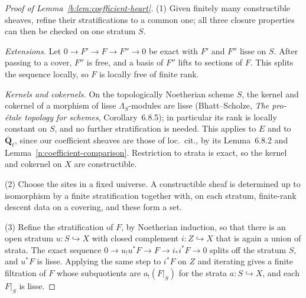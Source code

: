 \documentclass[11pt,a4paper]{article}
\numberwithin{equation}{section}
\theoremstyle{definition}
\theoremstyle{remark}
\newcommand{\Qbar}{\overline{\mathbf Q}_\ell}
\begin{document}
\begin{proof}[Proof of Lemma~\ref{b:lem:coefficient-heart}]
(1) Given finitely many constructible sheaves, refine their
stratifications to a common one; all three closure properties can then
be checked on one stratum $S$.

\emph{Extensions.} Let $0\to F'\to F\to F''\to0$ be exact with $F'$ and
$F''$ lisse on $S$. After passing to a cover, $F''$ is free, and a basis
of $F''$ lifts to sections of $F$. This splits the sequence locally, so
$F$ is locally free of finite rank.

\emph{Kernels and cokernels.} On the topologically Noetherian scheme
$S$, the kernel and cokernel of a morphism of lisse $\Lambda_S$-modules
are lisse (Bhatt--Scholze, \emph{The pro-\'etale topology for schemes},
Corollary~6.8.5); in particular its rank is locally constant on $S$, and
no further stratification is needed. This applies to $E$ and to $\Qbar$,
since our coefficient sheaves are those of loc.\ cit., by its
Lemma~6.8.2 and Lemma~\ref{n:coefficient-comparison}. Restriction to
strata is exact, so the kernel and cokernel on $X$ are constructible.

(2) Choose the sites in a fixed universe. A constructible sheaf is
determined up to isomorphism by a finite stratification together with,
on each stratum, finite-rank descent data on a covering, and these form a
set.

(3) Refine the stratification of $F$, by Noetherian induction, so that
there is an open stratum $u:S\hookrightarrow X$ with closed complement
$i:Z\hookrightarrow X$ that is again a union of strata. The exact sequence
$0\to u_!u^*F\to F\to i_*i^*F\to0$ splits off the stratum $S$, and
$u^*F$ is lisse. Applying the same step to $i^*F$ on $Z$ and iterating
gives a finite filtration of $F$ whose subquotients are $a_!(F|_S)$ for
the strata $a:S\hookrightarrow X$, and each $F|_S$ is lisse.
\end{proof}
\end{document}
